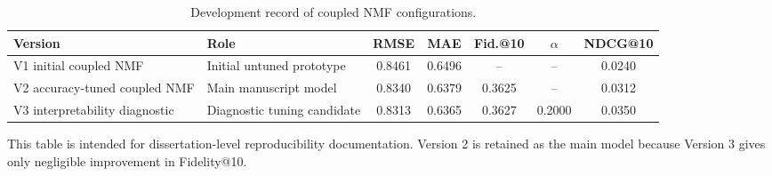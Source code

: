 \begin{table}[htbp]
\centering
\caption{Development record of coupled NMF configurations.}
\label{tab:appendix_model_development_versions}
\begin{tabular}{llccccc}
\toprule
Version & Role & RMSE & MAE & Fid.@10 & $\alpha$ & NDCG@10 \\
\midrule
V1 initial coupled NMF & Initial untuned prototype & 0.8461 & 0.6496 & -- & -- & 0.0240 \\
V2 accuracy-tuned coupled NMF & Main manuscript model & 0.8340 & 0.6379 & 0.3625 & -- & 0.0312 \\
V3 interpretability diagnostic & Diagnostic tuning candidate & 0.8313 & 0.6365 & 0.3627 & 0.2000 & 0.0350 \\
\bottomrule
\end{tabular}
\vspace{0.35em}
\begin{minipage}{0.92\textwidth}
\footnotesize This table is intended for dissertation-level reproducibility documentation. Version 2 is retained as the main model because Version 3 gives only negligible improvement in Fidelity@10.
\end{minipage}
\end{table}
